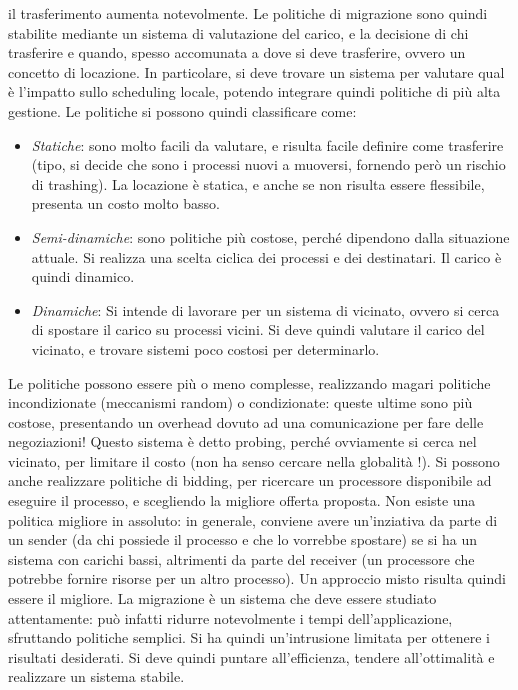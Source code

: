 il trasferimento aumenta notevolmente.
Le politiche di migrazione sono quindi stabilite mediante un sistema di valutazione del carico, e la decisione di chi
trasferire e quando, spesso accomunata a dove si deve trasferire, ovvero un concetto di locazione. In particolare, si
deve trovare un sistema per valutare qual è l'impatto sullo scheduling locale, potendo integrare quindi politiche di più
alta gestione. Le politiche si possono quindi classificare come:
\begin{itemize}
 \item \textit{Statiche}: sono molto facili da valutare, e risulta facile definire come trasferire (tipo, si decide che
 sono i processi nuovi a muoversi, fornendo però un rischio di trashing). La locazione è statica, e anche se non
 risulta essere flessibile, presenta un costo molto basso.
 \item \textit{Semi-dinamiche}: sono politiche più costose, perché dipendono dalla situazione attuale. Si realizza una
 scelta ciclica dei processi e dei destinatari. Il carico è quindi dinamico.
 \item \textit{Dinamiche}: Si intende di lavorare per un sistema di vicinato, ovvero si cerca di spostare il carico su
 processi vicini. Si deve quindi valutare il carico del vicinato, e trovare sistemi poco costosi per determinarlo.
\end{itemize}
Le politiche possono essere più o meno complesse, realizzando magari politiche incondizionate (meccanismi random) o
condizionate: queste ultime sono più costose, presentando un overhead dovuto ad una comunicazione per fare delle
negoziazioni! Questo sistema è detto probing, perché ovviamente si cerca nel vicinato, per limitare il costo (non ha
senso cercare nella globalità !). Si possono anche realizzare politiche di bidding, per ricercare un processore
disponibile ad eseguire il processo, e scegliendo la migliore offerta proposta.
Non esiste una politica migliore in assoluto: in generale, conviene avere un'inziativa da parte di un sender (da chi
possiede il processo e che lo vorrebbe spostare) se si ha un sistema con carichi bassi, altrimenti da parte del receiver
(un processore che potrebbe fornire risorse per un altro processo). Un approccio misto risulta quindi essere il
migliore.
La migrazione è un sistema che deve essere studiato attentamente: può infatti ridurre notevolmente i tempi
dell'applicazione, sfruttando politiche semplici. Si ha quindi un'intrusione limitata per ottenere i risultati
desiderati. Si deve quindi puntare all'efficienza, tendere all'ottimalità e realizzare un sistema stabile.
